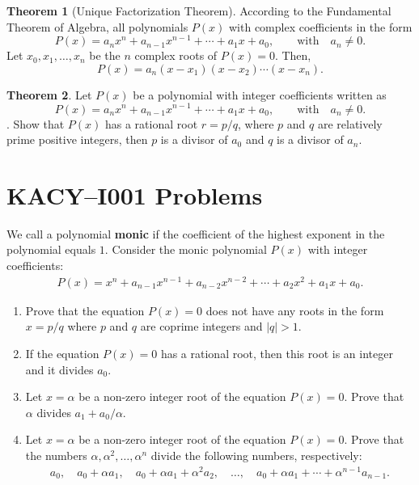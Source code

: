\documentclass[12pt,a4paper]{memoir}
\theoremstyle{definition}
\newtheorem{theorem}{Theorem}
\begin{document}
	\begin{theorem}[Unique Factorization Theorem]
		According to the Fundamental Theorem of Algebra, all polynomials $P(x)$ with complex coefficients in the form
		\[P(x)=a_nx^n+a_{n-1}x^{n-1}+\cdots+a_1x+a_0, \qquad \text{with} \quad a_n\neq 0.\]
		Let $x_0,x_1,\dots,x_n$ be the $n$ complex roots of $P(x)=0$. Then, 
		\[P(x)=a_n(x-x_1)(x-x_2)\cdots(x-x_n).\]
	\end{theorem}
	
	
	
	
	\begin{tcolorbox}[title={Rational Root Theorem}]
		\begin{theorem}
			Let $P(x)$ be a polynomial with integer coefficients written as \[P(x)=a_nx^n+a_{n-1}x^{n-1}+\cdots+a_1x+a_0, \qquad \text{with} \quad a_n\neq 0.\]. Show that $P(x)$ has a rational root $r=p/q$, where $p$ and $q$ are relatively prime positive integers, then $p$ is a divisor of $a_0$ and $q$ is a divisor of $a_n$.
		\end{theorem}
	\end{tcolorbox}
	
	\section*{KACY--I001 Problems}
	\begin{question}
		We call a polynomial \textbf{monic} if the coefficient of the highest exponent in the polynomial equals $1$. Consider the monic polynomial $P(x)$ with integer coefficients:
		\begin{align*}
			P(x)=x^n + a_{n-1}x^{n-1} + a_{n-2}x^{n-2} + \cdots + a_2x^2+a_1x+a_0.
		\end{align*}
		\begin{enumerate}
			\item Prove that the equation $P(x)=0$ does not have any roots in the form $x=p/q$ where $p$ and $q$ are coprime integers and $|q|>1$.
			\item If the equation $P(x)=0$ has a rational root, then this root is an integer and it divides $a_0$.
			\item Let $x=\alpha$ be a non-zero integer root of the equation $P(x)=0$. Prove that $\alpha$ divides $a_1 + {a_0}/{\alpha}$.
			\item Let $x=\alpha$ be a non-zero integer root of the equation $P(x)=0$. Prove that the numbers $\alpha, \alpha^2, \dots, \alpha^n$ divide the following numbers, respectively:
			\begin{align*}
				a_0, \quad a_0+\alpha a_1, \quad a_0+\alpha a_1+\alpha^2 a_2, \quad\dots, \quad a_0+\alpha a_1+\cdots+\alpha^{n-1} a_{n-1}.
			\end{align*}
		\end{enumerate}
	\end{question}
\end{document}
